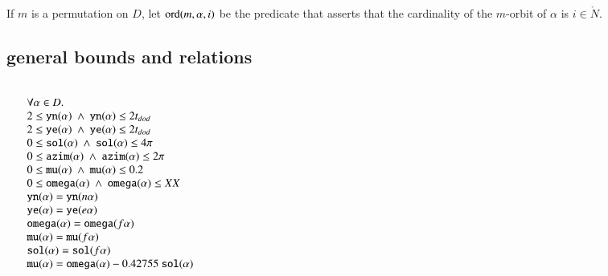If $m$ is  a permutation on $D$, let ${\operatorname{ord}}(m,\alpha,i)$
be the predicate that asserts that the cardinality of the $m$-orbit
of $\alpha$ is $i\in\ring{N}$.
\bigskip

\def\sland{\ \land\ }

\subsection{general bounds and relations}

$$
\begin{array}{lll}
\leftalign\\
   \forall \alpha\in D.\\
    2 \le \optt{yn}(\alpha) \sland
    \optt{yn}(\alpha) \le 2t_{dod} \\
    2 \le \optt{ye}(\alpha) \sland
    \optt{ye}(\alpha) \le 2t_{dod}\\
   0 \le \optt{sol}(\alpha) \sland
     \optt{sol}(\alpha) \le 4 \pi \\
   0 \le \optt{azim}(\alpha) \sland
     \optt{azim}(\alpha) \le 2\pi \\
   0 \le \optt{mu}(\alpha) \sland
      \optt{mu}(\alpha) \le 0.2 \\
   0 \le \optt{omega}(\alpha) \sland
      \optt{omega}(\alpha) \le XX \\
  \optt{yn}(\alpha) = \optt{yn}(n\alpha) \\
  \optt{ye}(\alpha) = \optt{ye}(e\alpha) \\
  \optt{omega}(\alpha) = \optt{omega}(f\alpha) \\
  \optt{mu}(\alpha) = \optt{mu}(f\alpha) \\
  \optt{sol}(\alpha)= \optt{sol}(f\alpha) \\
  \optt{mu}(\alpha) = \optt{omega}(\alpha) - 0.42755\ \optt{sol}(\alpha) \\

\end{array}
$$



